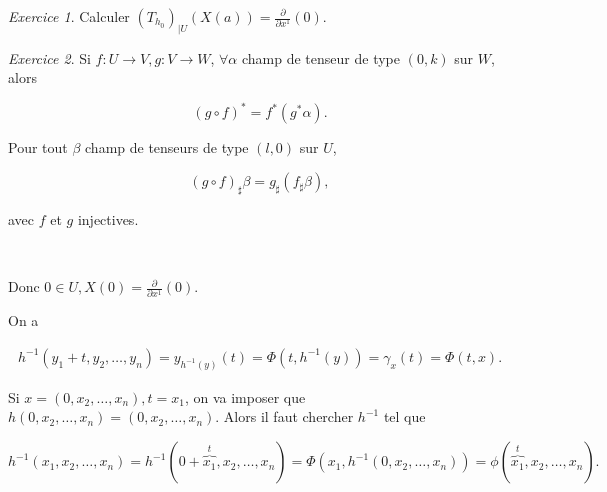 \documentclass[french]{article}
\theoremstyle{definition}
\theoremstyle{remark}
\newtheorem{exo}{Exercice}
\begin{document}
\begin{exo}
  Calculer \((T _{h_0})_{\mid U}(X(a)) = \displaystyle \frac{\partial  }{\partial x ^{1}}(0)\).
\end{exo}

\begin{exo}
  Si \(f : U \longrightarrow V, g : V \longrightarrow W\), \(\forall \alpha\) champ de tenseur de type \((0, k)\) sur \(W\), alors

  \[(g \circ f)^{*} = f ^{*}(g ^{*}\alpha).\]

  Pour tout \(\beta\) champ de tenseurs de type \((l,0)\) sur \(U\),

  \[(g \circ f)_{\sharp}\beta = g _{\sharp}(f _{\sharp}\beta),\]

  avec \(f\) et \(g\) injectives.
\end{exo}

\

Donc \(0 \in U, X(0) = \frac{\partial  }{\partial x ^{1}}(0)\).


On a

\begin{gather*}
  h ^{-1}(y_1+t, y_2, \dots, y_n) = y _{h ^{-1}(y)}(t) = \Phi(t,h ^{-1}(y)) = \gamma_x(t) = \Phi(t,x).
\end{gather*}

Si \(x= (0, x_2, \dots, x_n), t=x_1\), on va imposer que \(h(0, x_2, \dots, x_n) = (0, x_2, \dots, x_n)\). Alors il faut chercher \(h ^{-1}\) tel que

\[h ^{-1}(x_1, x_2, \dots, x_n) = h ^{-1}(0+\overbrace{x_1}^{t}, x_2, \dots, x_n) = \Phi(x_1, h ^{-1}(0,x_2, \dots, x_n)) = \phi(\overbrace{x_1}^{t}, x_2, \dots, x_n).\]
\end{document}
